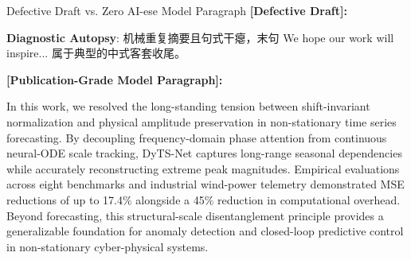 \begin{ExampleBox}{Defective Draft vs. Zero AI-ese Model Paragraph}
\textbf{\color{TargetHighlight}[Defective Draft]:}\par
{}\par\vspace{4pt}
\textbf{Diagnostic Autopsy}: 机械重复摘要且句式干瘪，末句 We hope our work will inspire... 属于典型的中式客套收尾。\par\vspace{6pt}
\textbf{\color{AcadNavy}[Publication-Grade Model Paragraph]:}\par
In this work, we resolved the long-standing tension between shift-invariant normalization and physical amplitude preservation in non-stationary time series forecasting. By decoupling frequency-domain phase attention from continuous neural-ODE scale tracking, DyTS-Net captures long-range seasonal dependencies while accurately reconstructing extreme peak magnitudes. Empirical evaluations across eight benchmarks and industrial wind-power telemetry demonstrated MSE reductions of up to 17.4\% alongside a 45\% reduction in computational overhead. Beyond forecasting, this structural-scale disentanglement principle provides a generalizable foundation for anomaly detection and closed-loop predictive control in non-stationary cyber-physical systems.
\end{ExampleBox}
